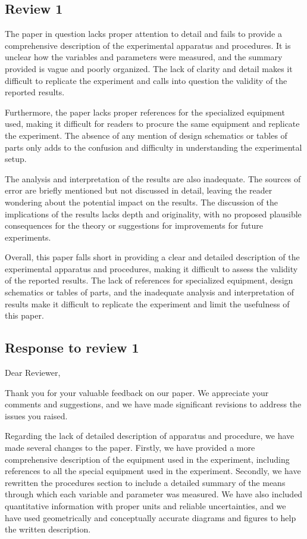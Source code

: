 
\newpage
\subsection*{Review 1}

The paper in question lacks proper attention to detail and fails to provide a comprehensive description of the experimental apparatus and procedures. It is unclear how the variables and parameters were measured, and the summary provided is vague and poorly organized. The lack of clarity and detail makes it difficult to replicate the experiment and calls into question the validity of the reported results.

Furthermore, the paper lacks proper references for the specialized equipment used, making it difficult for readers to procure the same equipment and replicate the experiment. The absence of any mention of design schematics or tables of parts only adds to the confusion and difficulty in understanding the experimental setup.

The analysis and interpretation of the results are also inadequate. The sources of error are briefly mentioned but not discussed in detail, leaving the reader wondering about the potential impact on the results. The discussion of the implications of the results lacks depth and originality, with no proposed plausible consequences for the theory or suggestions for improvements for future experiments.

Overall, this paper falls short in providing a clear and detailed description of the experimental apparatus and procedures, making it difficult to assess the validity of the reported results. The lack of references for specialized equipment, design schematics or tables of parts, and the inadequate analysis and interpretation of results make it difficult to replicate the experiment and limit the usefulness of this paper.

\subsection*{Response to review 1}
Dear Reviewer,

Thank you for your valuable feedback on our paper. We appreciate your comments and suggestions, and we have made significant revisions to address the issues you raised.

Regarding the lack of detailed description of apparatus and procedure, we have made several changes to the paper. Firstly, we have provided a more comprehensive description of the equipment used in the experiment, including references to all the special equipment used in the experiment. Secondly, we have rewritten the procedures section to include a detailed summary of the means through which each variable and parameter was measured. We have also included quantitative information with proper units and reliable uncertainties, and we have used geometrically and conceptually accurate diagrams and figures to help the written description.

